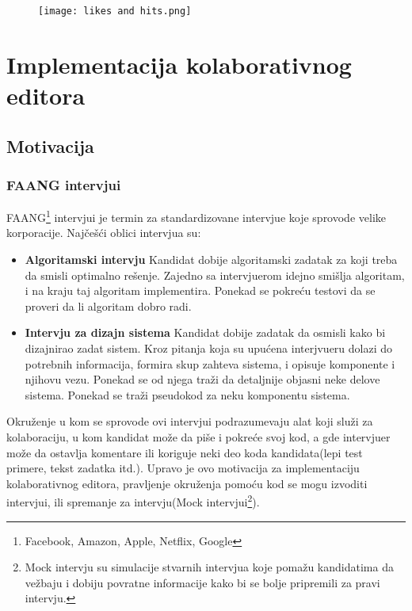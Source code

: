\documentclass[12pt]{article}
\newcommand{\startnewsection}{
    \clearpage %
    \ifodd\value{page}\else %
        \hbox{} %
        \newpage %
    \fi
}
\begin{document}
\begin{figure}[h]
	\centering
	\texttt{[image: likes and hits.png]}
	
\end{figure}

\startnewsection

\section{Implementacija kolaborativnog editora}

\subsection{Motivacija}

\subsubsection{FAANG intervjui}

FAANG\footnote{Facebook, Amazon, Apple, Netflix, Google} intervjui je termin za standardizovane intervjue koje sprovode velike korporacije. Najčešći oblici intervjua su:

\begin{itemize}
    \item \textbf{Algoritamski intervju} Kandidat dobije algoritamski zadatak za koji treba da smisli optimalno rešenje. Zajedno sa intervjuerom idejno smišlja algoritam, i na kraju taj algoritam implementira. Ponekad se pokreću testovi da se proveri da li algoritam dobro radi.

    \item \textbf{Intervju za dizajn sistema} Kandidat dobije zadatak da osmisli kako bi dizajnirao zadat sistem. Kroz pitanja koja su upućena interjvueru dolazi do potrebnih informacija, formira skup zahteva sistema, i opisuje komponente i njihovu vezu. Ponekad se od njega traži da detaljnije objasni neke delove sistema. Ponekad se traži pseudokod za neku komponentu sistema.
\end{itemize}

Okruženje u kom se sprovode ovi intervjui podrazumevaju alat koji služi za kolaboraciju, u kom kandidat može da piše i pokreće svoj kod, a gde intervjuer može da ostavlja komentare ili koriguje neki deo koda kandidata(lepi test primere, tekst zadatka itd.). Upravo je ovo motivacija za implementaciju kolaborativnog editora, pravljenje okruženja pomoću kod se mogu izvoditi intervjui, ili spremanje za intervju(Mock intervjui\footnote{Mock intervju su simulacije stvarnih intervjua koje pomažu kandidatima da vežbaju i dobiju povratne informacije kako bi se bolje pripremili za pravi intervju.}).
\end{document}
